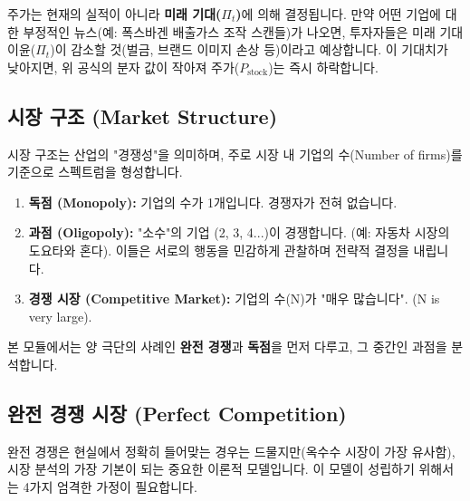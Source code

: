 \documentclass[11pt,a4paper]{article}
\theoremstyle{definition}
\begin{document}
주가는 현재의 실적이 아니라 \textbf{미래 기대($\Pi_t$)}에 의해 결정됩니다.
만약 어떤 기업에 대한 부정적인 뉴스(예: 폭스바겐 배출가스 조작 스캔들)가 나오면,
투자자들은 미래 기대 이윤($\Pi_t$)이 감소할 것(벌금, 브랜드 이미지 손상 등)이라고 예상합니다.
이 기대치가 낮아지면, 위 공식의 분자 값이 작아져 주가($P_{\text{stock}}$)는 즉시 하락합니다.

\subsection{시장 구조 (Market Structure)}

시장 구조는 산업의 "경쟁성"을 의미하며, 주로 시장 내 기업의 수(Number of firms)를 기준으로 스펙트럼을 형성합니다.

\begin{enumerate}
    \item \textbf{독점 (Monopoly):} 기업의 수가 1개입니다. 경쟁자가 전혀 없습니다.
    \item \textbf{과점 (Oligopoly):} "소수"의 기업 (2, 3, 4...)이 경쟁합니다. (예: 자동차 시장의 도요타와 혼다). 이들은 서로의 행동을 민감하게 관찰하며 전략적 결정을 내립니다.
    \item \textbf{경쟁 시장 (Competitive Market):} 기업의 수(N)가 "매우 많습니다". (N is very large).
\end{enumerate}

본 모듈에서는 양 극단의 사례인 \textbf{완전 경쟁}과 \textbf{독점}을 먼저 다루고, 그 중간인 과점을 분석합니다.

\subsection{완전 경쟁 시장 (Perfect Competition)}

완전 경쟁은 현실에서 정확히 들어맞는 경우는 드물지만(옥수수 시장이 가장 유사함), 시장 분석의 가장 기본이 되는 중요한 이론적 모델입니다. 이 모델이 성립하기 위해서는 4가지 엄격한 가정이 필요합니다.
\end{document}
